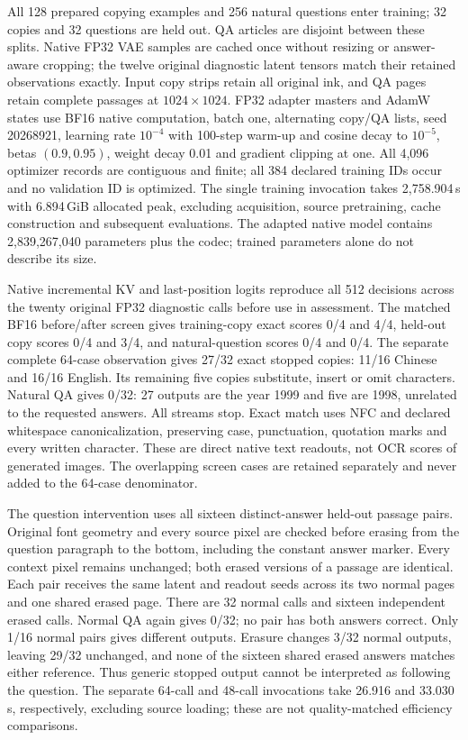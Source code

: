 \documentclass[10pt,a4paper]{article}
\begin{document}
All 128 prepared copying examples and 256 natural questions enter training;
32 copies and 32 questions are held out. QA articles are disjoint between
these splits. Native FP32 VAE samples are cached once without resizing or
answer-aware cropping; the twelve original diagnostic latent tensors match
their retained observations exactly. Input copy strips retain all original
ink, and QA pages retain complete passages at $1024\times1024$. FP32 adapter
masters and AdamW states use BF16 native computation, batch one, alternating
copy/QA lists, seed 20268921, learning rate $10^{-4}$ with 100-step warm-up
and cosine decay to $10^{-5}$, betas $(0.9,0.95)$, weight decay 0.01 and
gradient clipping at one. All 4,096 optimizer records are contiguous and
finite; all 384 declared training IDs occur and no validation ID is optimized.
The single training invocation takes 2,758.904\,s with 6.894\,GiB allocated
peak, excluding acquisition, source pretraining, cache construction and
subsequent evaluations. The adapted native model contains 2,839,267,040
parameters plus the codec; trained parameters alone do not describe its size.

Native incremental KV and last-position logits reproduce all 512 decisions
across the twenty original FP32 diagnostic calls before use in assessment.
The matched BF16 before/after screen gives training-copy exact scores 0/4
and 4/4, held-out copy scores 0/4 and 3/4, and natural-question scores 0/4
and 0/4. The separate complete 64-case observation gives 27/32 exact stopped
copies: 11/16 Chinese and 16/16 English. Its remaining five copies substitute,
insert or omit characters. Natural QA gives 0/32: 27 outputs are the year 1999
and five are 1998, unrelated to the requested answers. All streams stop.
Exact match uses NFC and declared whitespace canonicalization, preserving
case, punctuation, quotation marks and every written character. These are
direct native text readouts, not OCR scores of generated images. The overlapping
screen cases are retained separately and never added to the 64-case denominator.

The question intervention uses all sixteen distinct-answer held-out passage
pairs. Original font geometry and every source pixel are checked before
erasing from the question paragraph to the bottom, including the constant
answer marker. Every context pixel remains unchanged; both erased versions
of a passage are identical. Each pair receives the same latent and readout
seeds across its two normal pages and one shared erased page. There are 32
normal calls and sixteen independent erased calls. Normal QA again gives
0/32; no pair has both answers correct. Only 1/16 normal pairs gives different
outputs. Erasure changes 3/32 normal outputs, leaving 29/32 unchanged, and
none of the sixteen shared erased answers matches either reference. Thus
generic stopped output cannot be interpreted as following the question.
The separate 64-call and 48-call invocations take 26.916 and 33.030\,s,
respectively, excluding source loading; these are not quality-matched
efficiency comparisons.
\end{document}
